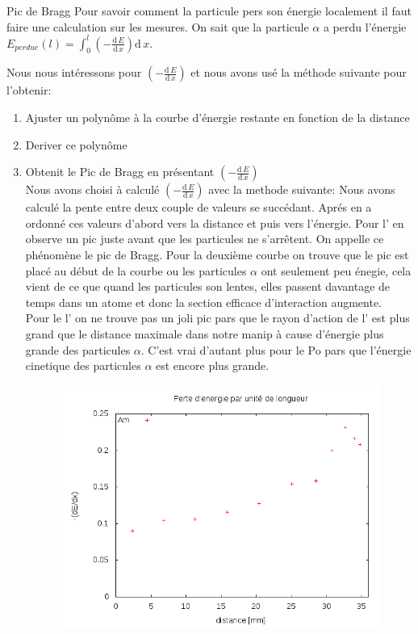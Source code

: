 \documentclass[a4paper,11pt,liststotocnumbered,bibtotocnumbered]{scrartcl}
\begin{document}
 \begin{section}{Pic de Bragg}
  Pour savoir comment la particule pers son énergie localement il faut faire une calculation sur les mesures. On sait que la particule $\alpha$ a perdu l'énergie $E_{perdue}(l)=\int_0^l \left(-\frac{\text{d}\,E}{\text{d}\,x}\right) \text{d}\,x$.

  Nous nous intéressons pour $\left(-\frac{\text{d}\,E}{\text{d}\,x}\right)$ et nous avons usé la méthode suivante pour l'obtenir:
  \begin{enumerate}
   \item Ajuster un polynôme à la courbe d'énergie restante en fonction de la distance
   \item Deriver ce polynôme
   \item Obtenit le Pic de Bragg en présentant $\left(-\frac{\text{d}\,E}{\text{d}\,x}\right)$ \\
Nous avons choisi à calculé $\left(-\frac{\text{d}\,E}{\text{d}\,x}\right)$ avec la methode suivante: Nous avons calculé la pente entre deux couple de valeurs se succédant. Aprés en a ordonné ces valeurs d'abord vers la distance et puis vers l'énergie. Pour l' en observe un pic juste avant que les particules ne s'arrêtent. On appelle ce phénomène le pic de Bragg. Pour la deuxième courbe on trouve que le pic est placé au début de la courbe ou les particules $\alpha$ ont seulement peu énegie, 	 cela vient de ce que quand les particules son lentes, elles passent davantage de temps dans un atome et donc la section efficace d'interaction augmente.\\
Pour le l' on ne trouve pas un joli pic pars que le rayon d'action de l' est plus grand que le distance maximale dans notre manip à cause d'énergie plus grande des particules $\alpha$. C'est vrai d'autant plus pour le Po pars que l'énergie cinetique des particules $\alpha$ est encore plus grande.
  \begin{figure}[H]
   \begin{minipage}{0.45\textwidth}
    \includegraphics[width=\textwidth]{Bilder/picAm.png}

\end{minipage}
\end{figure}
\end{enumerate}
\end{section}
\end{document}
